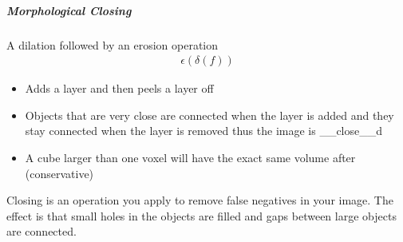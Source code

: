 \documentclass[letterpaper,10pt,english]{sphinxmanual}
\begin{document}
\noindent{}


\subparagraph{Morphological Closing}
\label{\detokenize{04-BasicSegmentation_Part2:morphological-closing}}
\sphinxAtStartPar
A dilation followed by an erosion operation
\begin{equation*}
\begin{split}\epsilon(\delta(f))\end{split}
\end{equation*}\begin{itemize}
\item {} 
\sphinxAtStartPar
Adds a layer and then peels a layer off

\item {} 
\sphinxAtStartPar
Objects that are very close are connected when the layer is added and they stay connected when the layer is removed thus the image is \_\_close\_\_d

\item {} 
\sphinxAtStartPar
A cube larger than one voxel will have the exact same volume after (conservative)

\end{itemize}

\sphinxAtStartPar
Closing is an operation you apply to remove false negatives in your image. The effect is that small holes in the objects are filled and gaps between large objects are connected.
\end{document}
